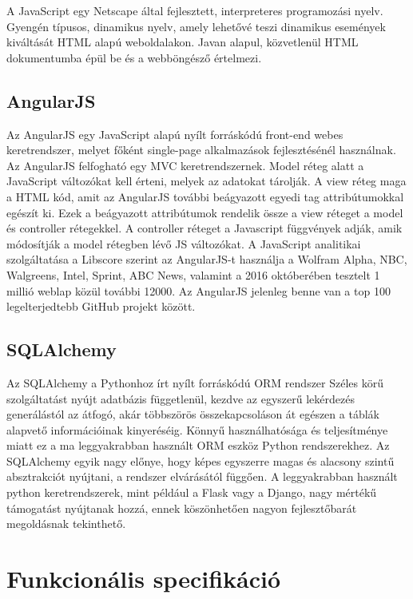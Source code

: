 A JavaScript egy Netscape által fejlesztett, interpreteres programozási nyelv. Gyengén típusos, dinamikus nyelv, amely lehetővé teszi dinamikus események kiváltását HTML alapú weboldalakon. Javan alapul, közvetlenül HTML dokumentumba épül be és a webböngésző értelmezi.

\subsection{AngularJS}

Az AngularJS egy JavaScript alapú nyílt forráskódú front-end webes keretrendszer, melyet főként single-page alkalmazások fejlesztésénél használnak. Az AngularJS felfogható egy MVC keretrendszernek. Model réteg alatt a JavaScript változókat kell érteni, melyek az adatokat tárolják. A view réteg maga a HTML kód, amit az AngularJS további beágyazott egyedi tag attribútumokkal egészít ki. Ezek a beágyazott attribútumok rendelik össze a view réteget a model és controller rétegekkel. A controller réteget a Javascript függvények adják, amik módosítják a model rétegben lévő JS változókat.
A JavaScript analitikai szolgáltatása a Libscore szerint az AngularJS-t használja a Wolfram Alpha, NBC, Walgreens, Intel, Sprint, ABC News, valamint a 2016 októberében tesztelt 1 millió weblap közül további 12000. Az AngularJS jelenleg benne van a top 100 legelterjedtebb GitHub projekt között.

\subsection{SQLAlchemy}

Az SQLAlchemy a Pythonhoz írt nyílt forráskódú ORM rendszer Széles körű szolgáltatást nyújt adatbázis függetlenül, kezdve az egyszerű lekérdezés generálástól az átfogó, akár többszörös összekapcsoláson át egészen a táblák alapvető információinak kinyeréséig. Könnyű használhatósága és teljesítménye miatt ez a ma leggyakrabban használt ORM eszköz Python rendszerekhez. 
Az SQLAlchemy egyik nagy előnye, hogy képes egyszerre magas és alacsony szintű absztrakciót nyújtani, a rendszer elvárásától függően. A leggyakrabban használt python keretrendszerek, mint például a Flask vagy a Django, nagy mértékű támogatást nyújtanak hozzá, ennek köszönhetően nagyon fejlesztőbarát megoldásnak tekinthető.

\section{Funkcionális specifikáció}

